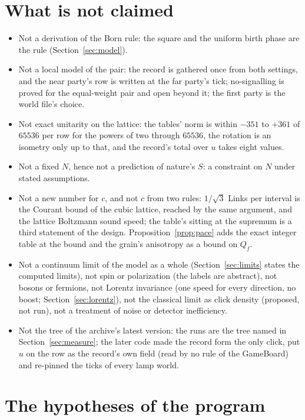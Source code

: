\documentclass[11pt]{article}
\theoremstyle{definition}
\begin{document}
\section{What is not claimed}\label{sec:notclaimed}

\begin{itemize}
\item Not a derivation of the Born rule: the square and the uniform birth
phase are the rule (Section~\ref{sec:model}).
\item Not a local model of the pair: the record is gathered once from
both settings, and the near party's row is written at the far party's
tick; no-signalling is proved for the equal-weight pair and open beyond
it; the first party is the world file's choice.
\item Not exact unitarity on the lattice: the tables' norm is within
$-351$ to $+361$ of $65536$ per row for the powers of two through
$65536$, the rotation is an isometry only up
to that, and the record's total over $u$ takes eight values.
\item Not a fixed $N$, hence not a prediction of nature's $S$: a
constraint on $N$ under stated assumptions.
\item Not a new number for $c$, and not $c$ from two rules: $1/\sqrt3$
Links per interval is the Courant bound of the cubic lattice, reached by
the same argument, and the lattice Boltzmann sound speed; the table's
sitting at the supremum is a third statement of the design.
Proposition~\ref{prop:pace} adds the exact integer table at the bound and
the grain's anisotropy as a bound on $Q_f$.
\item Not a continuum limit of the model as a whole (Section~\ref{sec:limits}
states the computed limits), not spin or polarization (the labels are
abstract), not bosons or fermions, not Lorentz invariance (one speed for
every direction, no boost; Section~\ref{sec:lorentz}), not the classical limit as click density
(proposed, not run), not a treatment of noise or detector inefficiency.
\item Not the tree of the archive's latest version: the runs are the
tree named in Section~\ref{sec:measure}; the later code made the record
form the only click, put $u$ on the row as the record's own field (read
by no rule of the GameBoard) and re-pinned the ticks of every lamp world.
\end{itemize}

\section{The hypotheses of the program}\label{sec:hyp}
\end{document}
